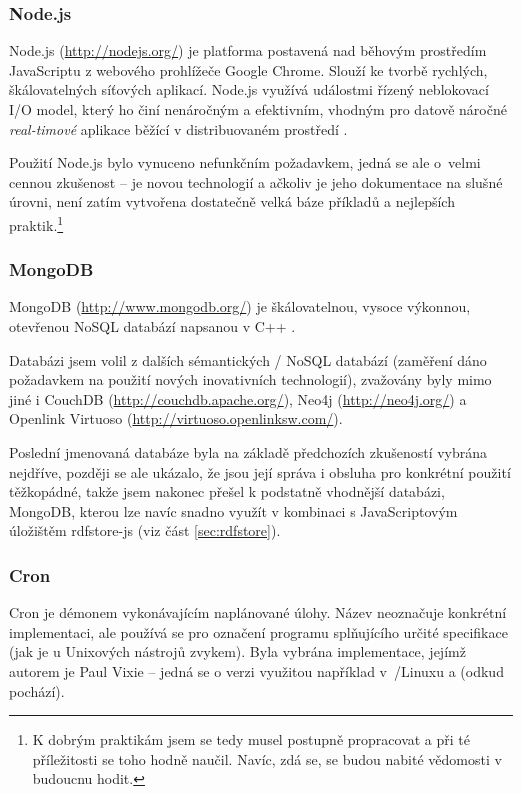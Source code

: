 \subsubsection{Node.js}
Node.js (\url{http://nodejs.org/}) je platforma postavená nad běhovým prostředím JavaScriptu z webového prohlížeče Google Chrome. Slouží ke tvorbě rychlých, škálovatelných síťových aplikací. Node.js využívá událostmi řízený neblokovací I/O model, který ho činí nenáročným a efektivním, vhodným pro datově náročné \textit{real-timové} aplikace běžící v distribuovaném prostředí \cite{Node}.

Použití Node.js bylo vynuceno nefunkčním požadavkem, jedná se ale o~velmi cennou zkušenost -- je novou technologií a ačkoliv je jeho dokumentace na slušné úrovni, není zatím vytvořena dostatečně velká báze příkladů a nejlepších praktik.\footnote{K dobrým praktikám jsem se tedy musel postupně propracovat a při té příležitosti se toho hodně naučil. Navíc, zdá se, se budou nabité vědomosti v budoucnu hodit.}

\subsubsection{MongoDB}
MongoDB (\url{http://www.mongodb.org/}) je škálovatelnou, vysoce výkonnou, otevřenou NoSQL databází napsanou v C++ \cite{Mongo}.

Databázi jsem volil z dalších sémantických / NoSQL databází (zaměření dáno požadavkem na použití nových inovativních technologií), zvažovány byly mimo jiné i CouchDB (\url{http://couchdb.apache.org/}), Neo4j (\url{http://neo4j.org/}) a Openlink Virtuoso (\url{http://virtuoso.openlinksw.com/}).

Poslední jmenovaná databáze byla na základě předchozích zkušeností vybrána nejdříve, později se ale ukázalo, že jsou její správa i obsluha pro konkrétní použití těžkopádné, takže jsem nakonec přešel k podstatně vhodnější databázi, MongoDB, kterou lze navíc snadno využít v kombinaci s JavaScriptovým  úložištěm rdfstore-js (viz část \ref{sec:rdfstore}).

\subsubsection{Cron}
Cron je démonem vykonávajícím naplánované úlohy. Název neoznačuje konkrétní implementaci, ale používá se pro označení programu splňujícího určité specifikace (jak je u Unixových nástrojů zvykem). Byla vybrána implementace, jejímž autorem je Paul Vixie -- jedná se o verzi využitou například v~/Linuxu a  (odkud pochází).

